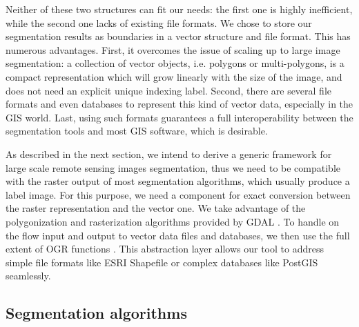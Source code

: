 \documentclass{josis}
\begin{document}
Neither of these two structures can fit our needs: the first one is
highly inefficient, while the second one lacks of existing file
formats. We chose to store our segmentation results as boundaries in a
vector structure and file format. This has numerous advantages. First,
it overcomes the issue of scaling up to large image segmentation: a
collection of vector objects, i.e. polygons or multi-polygons, is a
compact representation which will grow linearly with the size of the
image, and does not need an explicit unique indexing label. Second,
there are several file formats and even databases to represent this
kind of vector data, especially in the GIS world. Last, using such
formats guarantees a full interoperability between the segmentation
tools and most GIS software, which is desirable.

As described in the next section, we intend to derive a generic
framework for large scale remote sensing images segmentation, thus we
need to be compatible with the raster output of most segmentation
algorithms, which usually produce a label image. For this purpose, we
need a component for exact conversion between the raster
representation and the vector one. We take advantage of the
polygonization and rasterization algorithms provided by GDAL
\cite{}. To handle on the flow input and output to vector data files
and databases, we then use the full extent of OGR functions
\cite{}. This abstraction layer allows our tool to address simple file
formats like ESRI Shapefile or complex databases like PostGIS
seamlessly.

\subsection{Segmentation algorithms}
\end{document}
